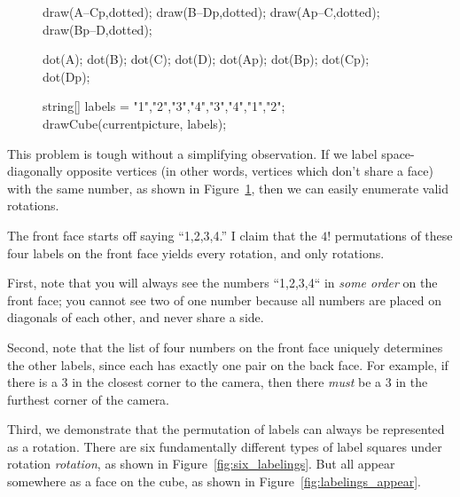 \documentclass[../key.tex]{subfiles}
\begin{document}
\begin{figure}[h]
	\begin{center}
		\begin{minipage}[b]{\textwidth}
			\centering
			\begin{asy}[width=0.3\textwidth]
			draw(A--Cp,dotted);
			draw(B--Dp,dotted);
			draw(Ap--C,dotted);
			draw(Bp--D,dotted);
			
			dot(A);
			dot(B);
			dot(C);
			dot(D);
			dot(Ap);
			dot(Bp);
			dot(Cp);
			dot(Dp);
			
			string[] labels = {"1","2","3","4","3","4","1","2"};
			drawCube(currentpicture, labels);
			\end{asy}
		\end{minipage}
	\end{center}
	\vspace*{-2\baselineskip}
	\begin{center}
		\begin{minipage}[t]{\textwidth}
			\label{fig:cube_vertices_label}
		\end{minipage}
	\end{center}
	\vspace*{-2\baselineskip}
\end{figure}

\noindent This problem is tough without a simplifying observation. If we label space-diagonally opposite vertices (in other words, vertices which don't share a face) with the same number, as shown in Figure~\ref{fig:cube_vertices_label}, then we can easily enumerate valid rotations.

The front face starts off saying ``1,2,3,4.'' I claim that the $4!$ permutations of these four labels on the front face yields every rotation, and only rotations.

First, note that you will always see the numbers ``1,2,3,4`` in \textit{some order} on the front face; you cannot see two of one number because all numbers are placed on diagonals of each other, and never share a side.

Second, note that the list of four numbers on the front face uniquely determines the other labels, since each has exactly one pair on the back face. For example, if there is a $3$ in the closest corner to the camera, then there \textit{must} be a $3$ in the furthest corner of the camera.

Third, we demonstrate that the permutation of labels can always be represented as a rotation. There are six fundamentally different types of label squares under rotation \textit{rotation}, as shown in Figure~\ref{fig:six_labelings}. But all appear somewhere as a face on the cube, as shown in Figure~\ref{fig:labelings_appear}.
\end{document}
